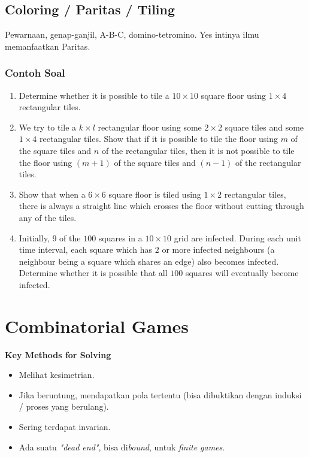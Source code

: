 \documentclass[11pt]{scrartcl}
\begin{document}
\subsection{Coloring / Paritas / Tiling}
Pewarnaan, genap-ganjil, A-B-C, domino-tetromino. Yes intinya ilmu memanfaatkan Paritas.
\subsubsection{Contoh Soal}
\begin{enumerate}
    \item Determine whether it is possible to tile a $10 \times 10$ square floor using $1 \times 4$ rectangular tiles.

\item We try to tile a $k \times l$ rectangular floor using some $2 \times 2$ square tiles and some $1 \times 4$ rectangular tiles. Show that if it is possible to tile the floor using $m$ of the square tiles and $n$ of the rectangular tiles, then it is not possible to tile the floor using $(m + 1)$ of the square tiles and $(n - 1)$ of the rectangular tiles.

\item Show that when a $6 \times 6$ square floor is tiled using $1 \times 2$ rectangular tiles, there is always a straight line which crosses the floor without cutting through any of the tiles.

\item Initially, $9$ of the $100$ squares in a $10 \times 10$ grid are infected. During each unit time interval, each square which has $2$ or more infected neighbours (a neighbour being a square which shares an edge) also becomes infected. Determine whether it is possible that all $100$ squares will eventually become infected.
\end{enumerate}

\section{Combinatorial Games}
\textbf{Key Methods for Solving}
\begin{itemize}
    \item Melihat kesimetrian.
    \item Jika beruntung, mendapatkan pola tertentu (bisa dibuktikan dengan induksi / proses yang berulang).
    \item Sering terdapat invarian.
    \item Ada suatu \textit{"dead end"}, bisa di\textit{bound}, untuk \textit{finite games}.
\end{itemize}
\end{document}
